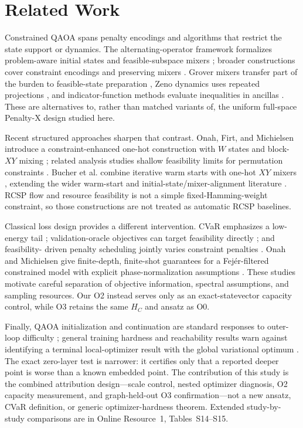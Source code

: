 \section{Related Work}
\label{sec:related}

Constrained QAOA spans penalty encodings and algorithms that restrict the
state support or dynamics. The alternating-operator framework formalizes
problem-aware initial states and feasible-subspace mixers
\cite{hadfield2019alternating}; broader constructions cover constraint
encodings and preserving mixers \cite{fuchs2022mixers,ruan2023constraints}.
Grover mixers transfer part of the burden to feasible-state preparation
\cite{bartschi2020grover}, Zeno dynamics uses repeated projections
\cite{herman2023zeno}, and indicator-function methods evaluate inequalities in
ancillas \cite{bucher2025penaltyfree}. These are alternatives to, rather than
matched variants of, the uniform full-space Penalty-X design studied here.

Recent structured approaches sharpen that contrast. Onah, Firt, and
Michielsen introduce a constraint-enhanced one-hot construction with $W$
states and block-$XY$ mixing \cite{onahfirt2025encoded}; related analysis
studies shallow feasibility limits for permutation constraints
\cite{onah2025limitations}. Bucher et al. combine iterative warm starts with
one-hot $XY$ mixers \cite{bucher2026iterative}, extending the wider warm-start
and initial-state/mixer-alignment literature
\cite{egger2021warm,he2023alignment}. RCSP flow and resource feasibility is
not a simple fixed-Hamming-weight constraint, so those constructions are not
treated as automatic RCSP baselines.

Classical loss design provides a different intervention. CVaR emphasizes a
low-energy tail \cite{barkoutsos2020cvar}; validation-oracle objectives can
target feasibility directly \cite{li2026feasibilityloss}; and feasibility-
driven penalty scheduling jointly varies constraint penalties
\cite{ferrari2026scheduling}. Onah and Michielsen give finite-depth,
finite-shot guarantees for a Fej\'er-filtered constrained model with explicit
phase-normalization assumptions \cite{onah2026fejer}. These studies motivate
careful separation of objective information, spectral assumptions, and
sampling resources. Our O2 instead serves only as an exact-statevector
capacity control, while O3 retains the same $H_C$ and ansatz as O0.

Finally, QAOA initialization and continuation are standard responses to
outer-loop difficulty \cite{zhou2020qaoa}; general training hardness and
reachability results warn against identifying a terminal local-optimizer
result with the global variational optimum
\cite{bittel2021training,akshay2021reachability}. The exact zero-layer test is
narrower: it certifies only that a reported deeper point is worse than a known
embedded point. The contribution of this study is the combined attribution
design---scale control, nested optimizer diagnosis, O2 capacity measurement,
and graph-held-out O3 confirmation---not a new ansatz, CVaR definition, or
generic optimizer-hardness theorem. Extended study-by-study comparisons are
in Online Resource~1, Tables~S14--S15.
